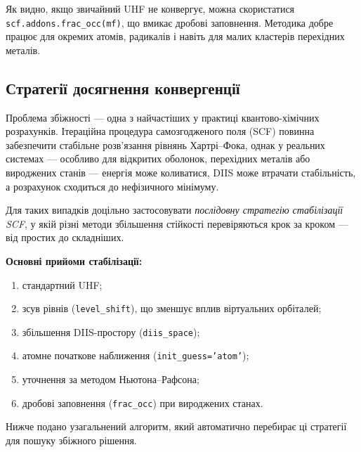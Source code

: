 Як видно, якщо звичайний UHF не конвергує, можна скористатися \texttt{scf.addons.frac\_occ(mf)}, що вмикає дробові заповнення.
Методика добре працює для окремих атомів, радикалів і навіть для малих кластерів перехідних металів.

\subsection{Стратегії досягнення конвергенції}

Проблема збіжності --- одна з найчастіших у практиці квантово-хімічних розрахунків.
Ітераційна процедура самозгодженого поля (SCF) повинна забезпечити стабільне розв’язання рівнянь Хартрі–Фока, однак у реальних системах --- особливо для відкритих оболонок, перехідних металів або вироджених станів --- енергія може коливатися, DIIS може втрачати стабільність, а розрахунок сходиться до нефізичного мінімуму.

Для таких випадків доцільно застосовувати \textit{послідовну стратегію стабілізації SCF}, у якій різні методи збільшення стійкості перевіряються крок за кроком --- від простих до складніших.

\medskip

\noindent\textbf{Основні прийоми стабілізації:}
\begin{enumerate}
    \item стандартний UHF;
    \item зсув рівнів (\texttt{level\_shift}), що зменшує вплив віртуальних орбіталей;
    \item збільшення DIIS-простору (\texttt{diis\_space});
    \item атомне початкове наближення (\texttt{init\_guess='atom'});
    \item уточнення за методом Ньютона–Рафсона;
    \item дробові заповнення (\texttt{frac\_occ}) при вироджених станах.
\end{enumerate}

\noindent Нижче подано узагальнений алгоритм, який автоматично перебирає ці стратегії для пошуку збіжного рішення.


